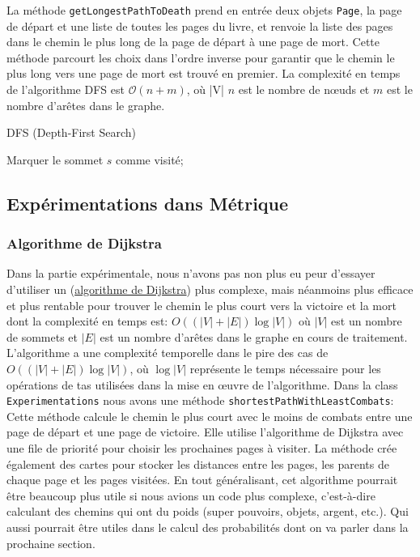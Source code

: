 \documentclass[a4paper,12pt]{article}
\begin{document}
La méthode \verb|getLongestPathToDeath| prend en entrée deux objets \verb|Page|, la page de départ et une liste de toutes les pages du livre, et renvoie la liste des pages dans le chemin le plus long de la page de départ à une page de mort. Cette méthode parcourt les choix dans l'ordre inverse pour garantir que le chemin le plus long vers une page de mort est trouvé en premier. La complexité en temps de l'algorithme DFS est $\mathcal{O}(n + m)$, où |V| $n$ est le nombre de nœuds et $m$ est le nombre d'arêtes dans le graphe.\\
\begin{algorithm}[H]
\caption{DFS (Depth-First Search)}
\SetAlgoLined
\DontPrintSemicolon


Marquer le sommet $s$ comme visité;
\end{algorithm}


\subsection{Expérimentations dans Métrique}
\subsubsection{Algorithme de Dijkstra}
Dans la partie expérimentale, nous n'avons pas non plus eu peur d'essayer d'utiliser un (\href{https://en.wikipedia.org/wiki/Depth-first_search}{algorithme de Dijkstra}) plus complexe, mais néanmoins plus efficace et plus rentable pour trouver le chemin le plus court vers la victoire et la mort dont la complexité en temps est: $O((|V| + |E|) \log |V|)$ où $|V|$ est un nombre de sommets et $|E|$ est un nombre d'arêtes  dans le graphe en cours de traitement. L'algorithme a une complexité temporelle dans le pire des cas de $O((|V| + |E|) \log |V|)$, où $\log |V|$ représente le temps nécessaire pour les opérations de tas utilisées dans la mise en œuvre de l'algorithme. Dans la class \verb|Experimentations| nous avons une méthode \verb|shortestPathWithLeastCombats|:
Cette méthode calcule le chemin le plus court avec le moins de combats entre une page de départ et une page de victoire. Elle utilise l'algorithme de Dijkstra avec une file de priorité pour choisir les prochaines pages à visiter. La méthode crée également des cartes pour stocker les distances entre les pages, les parents de chaque page et les pages visitées. En tout généralisant, cet algorithme pourrait être beaucoup plus utile si nous avions un code plus complexe, c'est-à-dire calculant des chemins qui ont du poids (super pouvoirs, objets, argent, etc.). Qui aussi pourrait être utiles dans le calcul des probabilités dont on va parler dans la prochaine section.
\end{document}
